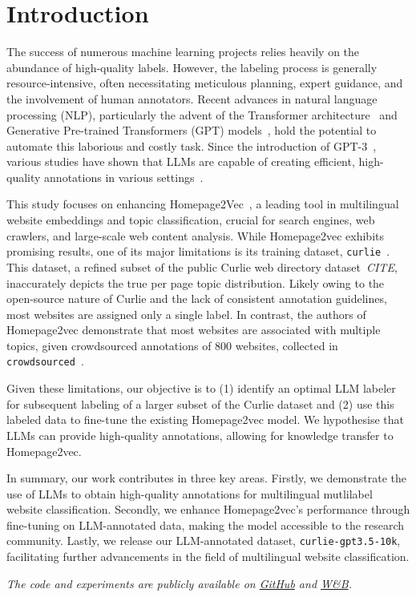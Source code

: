 \section{Introduction}

The success of numerous machine learning projects relies heavily on the abundance of high-quality labels. However, the labeling process is generally resource-intensive, often necessitating meticulous planning, expert guidance, and the involvement of human annotators. Recent advances in natural language processing (NLP), particularly the advent of the Transformer architecture~\cite{transformers} and Generative Pre-trained Transformers (GPT) models~\cite{gpt3, gpt4}, hold the potential to automate this laborious and costly task. Since the introduction of GPT-3~\cite{gpt3}, various studies have shown that LLMs are capable of creating efficient, high-quality annotations in various settings~\cite{prompt-tuning,reduce-labeling-cost,is-gpt3-good-annot, annollm}.

This study focuses on enhancing Homepage2Vec~\cite{homepage2vec}, a leading tool in multilingual website embeddings and topic classification, crucial for search engines, web crawlers, and large-scale web content analysis. While Homepage2vec exhibits promising results, one of its major limitations is its training dataset, \texttt{curlie}~\cite{homepage2vec}. This dataset, a refined subset of the public Curlie web directory dataset~\textit{CITE}, inaccurately depicts the true per page topic distribution. Likely owing to the open-source nature of Curlie and the lack of consistent annotation guidelines, most websites are assigned only a single label. In contrast, the authors of Homepage2vec demonstrate that most websites are  associated with multiple topics, given crowdsourced annotations of 800 websites, collected in \texttt{crowdsourced}~\cite{homepage2vec}.

Given these limitations, our objective is to (1) identify an optimal LLM labeler for subsequent labeling of a larger subset of the Curlie dataset and (2) use this labeled data to fine-tune the existing Homepage2vec model. We hypothesise that LLMs can provide high-quality annotations, allowing for knowledge transfer to Homepage2vec.

In summary, our work contributes in three key areas. Firstly, we demonstrate the use of LLMs to obtain high-quality annotations for multilingual mutlilabel website classification. Secondly, we enhance Homepage2vec's performance through fine-tuning on LLM-annotated data, making the model accessible to the research community. Lastly, we release our LLM-annotated dataset, \texttt{curlie-gpt3.5-10k}, facilitating further advancements in the field of multilingual website classification.

\textit{The code and experiments are publicly available on \href{https://github.com/CS-433/ml-project-2-mlp}{GitHub} and \href{https://wandb.ai/ml-project-2-mlp/homepage2vec}{W\&B}.}
